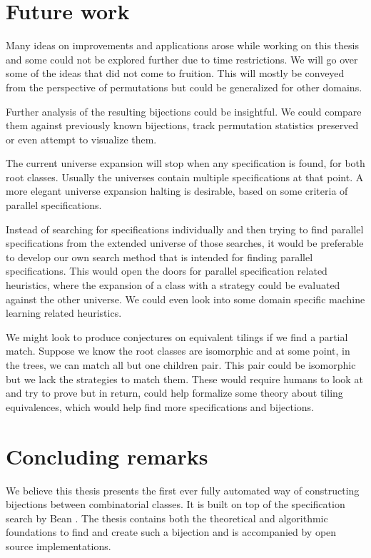 \label{ch:conclusion}

\section{Future work}\label{s:fw}
Many ideas on improvements and applications arose while working on this thesis and some could not be explored further due to time restrictions. We will go over some of the ideas that did not come to fruition. This will mostly be conveyed from the perspective of permutations but could be generalized for other domains.

Further analysis of the resulting bijections could be insightful. We could compare them against previously known bijections, track permutation statistics preserved or even attempt to visualize them.

The current universe expansion will stop when any specification is found, for both root classes. Usually the universes contain multiple specifications at that point. A more elegant universe expansion halting is desirable, based on some criteria of parallel specifications.

Instead of searching for specifications individually and then trying to find parallel specifications from the extended universe of those searches, it would be preferable to develop our own search method that is intended for finding parallel specifications. This would open the doors for parallel specification related heuristics, where the expansion of a class with a strategy could be evaluated against the other universe. We could even look into some domain specific machine learning related heuristics. 

We might look to produce conjectures on equivalent tilings if we find a partial match. Suppose we know the root classes are isomorphic and at some point, in the trees, we can match all but one children pair. This pair could be isomorphic but we lack the strategies to match them. These would require humans to look at and try to prove but in return, could help formalize some theory about tiling equivalences, which would help find more specifications and bijections.

\section{Concluding remarks}
We believe this thesis presents the first ever fully automated way of constructing bijections between combinatorial classes. It is built on top of the specification search by Bean \cite{BeanPhd:phd}. The thesis contains both the theoretical and algorithmic foundations to find and create such a bijection and is accompanied by open source implementations.

